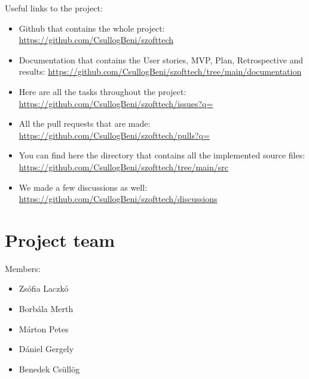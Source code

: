 \documentclass{article}
\begin{document}
Useful links to the project:
\begin{itemize}
    \item Github that contains the whole project: \href{https://github.com/CsullogBeni/szofttech}{https://github.com/CsullogBeni/szofttech}
    \item Documentation that contains the User stories, MVP, Plan, Retrospective and results: \href{https://github.com/CsullogBeni/szofttech/tree/main/documentation}{https://github.com/CsullogBeni/szofttech/tree/main/documentation}
    \item Here are all the tasks throughout the project: \href{https://github.com/CsullogBeni/szofttech/issues?q=}{https://github.com/CsullogBeni/szofttech/issues?q=}
    \item All the pull requests that are made: \href{https://github.com/CsullogBeni/szofttech/pulls?q=}{https://github.com/CsullogBeni/szofttech/pulls?q=}
    \item You can find here the directory that contains all the implemented source files: \href{https://github.com/CsullogBeni/szofttech/tree/main/src}{https://github.com/CsullogBeni/szofttech/tree/main/src}
    \item We made a few discussions as well: \href{https://github.com/CsullogBeni/szofttech/discussions}{https://github.com/CsullogBeni/szofttech/discussions}
\end{itemize}

\section{Project team}
    Members:
    \begin{itemize}
        \item Zsófia Laczkó 
        \item Borbála Merth 
        \item Márton Petes
        \item Dániel Gergely 
        \item Benedek Csüllög
    \end{itemize}
\end{document}
